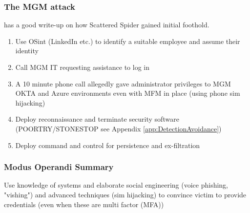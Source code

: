 \documentclass[
	letterpaper, %
	10pt, %
	unnumberedsections, %
	twoside, %
]{APAAssignment}
\begin{document}
\subsubsection{The MGM attack} \cite{UHonMGM-ALPHV} has a good write-up on how Scattered Spider gained initial foothold.

\begin{enumerate}
	\item Use OSint (LinkedIn etc.) to identify a suitable employee and assume their identity
	\item Call MGM IT requesting assistance to log in
	\item A 10 minute phone call allegedly gave administrator privileges to MGM OKTA and Azure environments even with MFM in place (using phone sim hijacking)
	\item Deploy reconnaissance and terminate security software (POORTRY/STONESTOP see Appendix \ref{app:DetectionAvoidance})\cite{TrellixScattetedSpider}
	\item Deploy command and control for persistence and ex-filtration
\end{enumerate}

\subsubsection{Modus Operandi Summary} Use knowledge of systems and elaborate social engineering (voice phishing, "vishing") and advanced techniques  (sim hijacking) to convince victim to provide credentials (even when these are multi factor (MFA))
\end{document}

